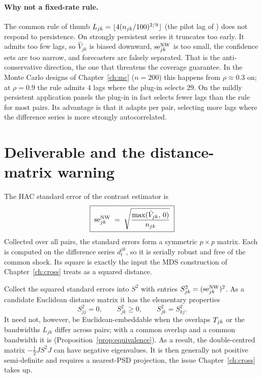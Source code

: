 \paragraph{Why not a fixed-rate rule.} The common rule of thumb
$L_{jk}=\lfloor 4(n_{jk}/100)^{2/9}\rfloor$ (the pilot lag of \citet{neweywest1994}) does
not respond to persistence. On strongly persistent series it truncates too early. It
admits too few lags, so $\hat V_{jk}$ is biased downward, $\mathrm{se}^{\mathrm{NW}}_{jk}$ is too small, the
confidence sets are too narrow, and forecasters are falsely separated. That is the
anti-conservative direction, the one that threatens the coverage guarantee. In the Monte
Carlo designs of Chapter~\ref{ch:mc} ($n=200$) this happens from $\rho\approx 0.3$ on; at
$\rho=0.9$ the rule admits $4$ lags where the plug-in selects $29$. On the mildly
persistent application panels the plug-in in fact selects fewer lags than the rule for
most pairs. Its advantage is that it adapts per pair, selecting more lags where the
difference series is more strongly autocorrelated.

\section{Deliverable and the distance-matrix warning}
\label{sec:se-deliverable}

The HAC standard error of the contrast estimator is
\begin{equation}
  \boxed{\;\mathrm{se}^{\mathrm{NW}}_{jk}
  \;=\; \sqrt{\frac{\max(\hat{V}_{jk},\,0)}{n_{jk}}}\;}
  \label{eq:senw}
\end{equation}
Collected over all pairs, the standard errors form a symmetric $p\times p$ matrix. Each
is computed on the difference series $d^{jk}_t$, so it is serially robust and free of
the common shock. Its square is exactly the input the MDS construction of
Chapter~\ref{ch:cross} treats as a squared distance.

Collect the squared standard errors into $S^2$ with entries $S^2_{jk} = (\mathrm{se}^{\mathrm{NW}}_{jk})^2$.
As a candidate Euclidean distance matrix it has the elementary properties
\begin{equation}
  S^2_{jj} = 0, \qquad S^2_{jk} \ge 0, \qquad S^2_{jk} = S^2_{kj}.
\end{equation}
It need not, however, be Euclidean-embeddable when the overlaps $T_{jk}$ or the bandwidths
$L_{jk}$ differ across pairs; with a common overlap and a common bandwidth it is
(Proposition~\ref{prop:equivalence}). As a result, the double-centred matrix
$-\tfrac12 J S^2 J$ can have negative eigenvalues. It is then generally not positive
semi-definite and requires a nearest-PSD projection, the issue Chapter~\ref{ch:cross}
takes up.
